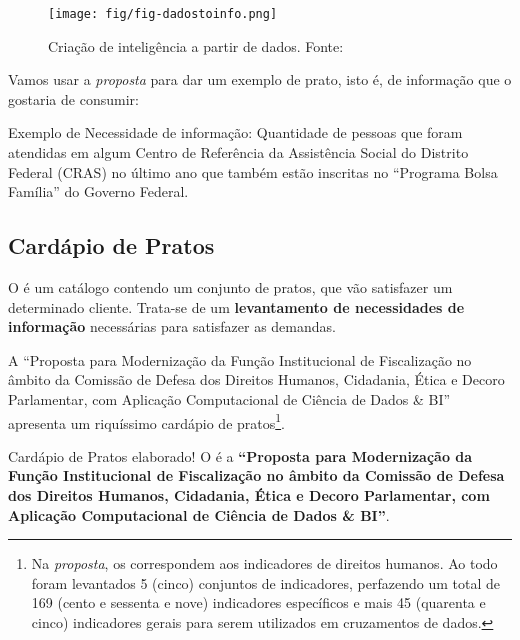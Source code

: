     \begin{figure}[h]
        \centering
        \texttt{[image: fig/fig-dadostoinfo.png]}
        \caption{Criação de inteligência a partir de dados. Fonte: \cite{propostaCDDHCEDP}}
        \label{fig:intro:dadostoinfo}
    \end{figure}    
    
    Vamos usar a \emph{proposta} para dar um exemplo de prato, isto é, de informação que o \CLIENTE \xspace gostaria de consumir:
    
    \begin{env-exemplo}{Exemplo de \PRATO}
        Necessidade de informação: Quantidade de pessoas que foram atendidas em algum Centro de Referência da Assistência Social do Distrito Federal (CRAS) no último ano que também estão inscritas no ``Programa Bolsa Família'' do Governo Federal.
    \end{env-exemplo}
    
\subsection*{Cardápio de Pratos}
\label{sub-cardapio}

    O \CARDAPIO \xspace é um catálogo contendo um conjunto de pratos, que vão satisfazer um determinado cliente. Trata-se de um \textbf{levantamento de necessidades de informação} necessárias para satisfazer as demandas.
    
    A ``Proposta para Modernização da Função Institucional de Fiscalização no âmbito da Comissão de Defesa dos Direitos Humanos, Cidadania, Ética e Decoro Parlamentar, com Aplicação Computacional de Ciência de Dados \& BI'' \cite{propostaCDDHCEDP} apresenta um riquíssimo cardápio de pratos\footnote{Na \emph{proposta}, os \PRATOS \xspace correspondem aos indicadores de direitos humanos. Ao todo foram levantados 5 (cinco) conjuntos de indicadores, perfazendo um total de 169 (cento e sessenta e nove) indicadores específicos e mais 45 (quarenta e cinco) indicadores gerais para serem utilizados em cruzamentos de dados.}. 
    
    \begin{env-destaque}{Cardápio de Pratos elaborado!}
        O \CARDAPIO \xspace é a \textbf{``Proposta para Modernização da Função Institucional de Fiscalização no âmbito da Comissão de Defesa dos Direitos Humanos, Cidadania, Ética e Decoro Parlamentar, com Aplicação Computacional de Ciência de Dados \& BI''}.
    \end{env-destaque}    
    
